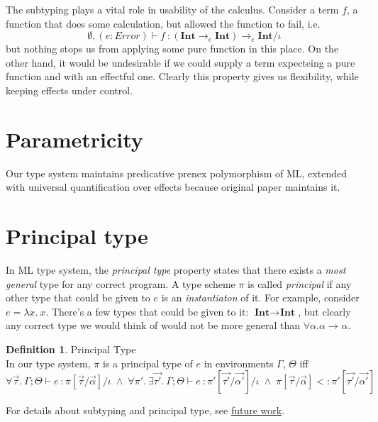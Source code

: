 \documentclass[declaration,shortabstract]{iithesis}
\theoremstyle{definition} \newtheorem{definition}{Definition}[section]
\newcommand{\types}[4][\Gamma;\Theta]{\ensuremath{{{#1} \vdash {#2} \: : {#3}/{#4}}}}
\newcommand{\arrow}[3]{{#1}\rightarrow_{#2}{#3}}
\newcommand{\lam}[1][x]{\ensuremath{\lambda #1.\:}}
\begin{document}
The subtyping plays a vital role in usability of the calculus.
Consider a term $f$, a function that does some calculation,
but allowed the function to fail, i.e.
$$
\types[\emptyset, (e: Error)]
    {f}
    {\arrow{(\arrow{\textbf{Int}}{e}{\textbf{Int}})}{e}{\textbf{Int}}}
    {\iota}
$$
but nothing stops us from applying some pure function in this place.
On the other hand, it would be undesirable if we could supply a term expecteing
a pure function and with an effectful one.
Clearly this property gives us flexibility, while keeping effects under control.


\section{Parametricity}
Our type system maintains predicative prenex polymorphism of ML,
extended with universal quantification over effects because original paper maintains it.


\section{Principal type}
In ML type system, the \textit{principal type} property states that there exists
a \textit{most general} type for any correct program\cite{principal}. 
A type scheme $\pi$ is called \textit{principal} if any other type that
could be given to $e$ is an \textit{instantiaton} of it.
For example, consider $e = \lam x$.
There's a few types that could be given to it: $\arrow{\textbf{Int}}{}{\textbf{Int}}$, 
but clearly any correct type we would think of would not be more general than $\forall \alpha . \arrow{\alpha}{}{\alpha}$.

\theoremstyle{definition}
\begin{definition}{Principal Type}
\\
In our type system, $\pi$ is a principal type of $e$ in environments $\Gamma$, $\Theta$ iff
$$ \forall \vec{\tau}. \: \types{e}{\pi[\vec{\tau} / \vec{\alpha}]}{\iota} \;\wedge\;
    \forall \pi'.\:\exists \vec{\tau'}.\: \types{e}{\pi'[\vec{\tau'} / \vec{\alpha'}]}{\iota} \;\wedge\; 
    \pi[\vec{\tau} / \vec{\alpha}] <: \pi'[\vec{\tau'} / \vec{\alpha'}]
$$
\end{definition}
For details about subtyping and principal type, see \hyperlink{chapter.6}{future work}.
\end{document}
